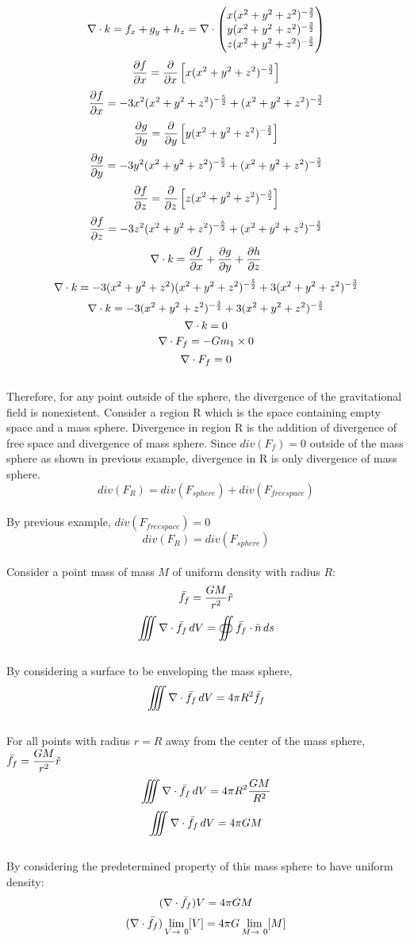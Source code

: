\documentclass[a4paper, 12pt]{report}
\begin{document}
\begin{center}
$$\nabla \cdot \displaystyle{k  =f_x + g_y + h_z =   \nabla\cdot\begin{pmatrix} x(x^2+y^2+z^2)^{-\frac{3}{2}}\\y(x^2+y^2+z^2)^{-\frac{3}{2}} \\z(x^2+y^2+z^2)^{-\frac{3}{2}} \end{pmatrix}}$$
$$\frac{\partial{f}}{\partial{x}}= \frac{\partial}{\partial{x}}\left[x(x^2+y^2+z^2)^{-\frac{3}{2}}\right]$$
$$\frac{\partial{f}}{\partial{x}}=-3x^2(x^2 +y ^2 + z^2)^{-\frac{5}{2}}+(x^2 + y^2 + z^2)^{-\frac{3}{2}}$$
$$\frac{\partial{g}}{\partial{y}}= \frac{\partial}{\partial{y}}\left[y(x^2+y^2+z^2)^{-\frac{3}{2}}\right]$$
$$\frac{\partial{g}}{\partial{y}}=-3y^2(x^2 +y ^2 + z^2)^{-\frac{5}{2}}+(x^2 + y^2 + z^2)^{-\frac{3}{2}}$$
$$\frac{\partial{f}}{\partial{z}}= \frac{\partial}{\partial{z}}\left[z(x^2+y^2+z^2)^{-\frac{3}{2}}\right]$$
$$\frac{\partial{f}}{\partial{z}}=-3z^2(x^2 +y ^2 + z^2)^{-\frac{5}{2}}+(x^2 + y^2 + z^2)^{-\frac{3}{2}}$$
$$\nabla \cdot k= \frac{\partial{f}}{\partial{x}} + \frac{\partial{g}}{\partial{y}} + \frac{\partial{h}}{\partial{z}}$$
$$\nabla \cdot k= -3(x^2 + y^2 + z^2)(x^2 +y ^2 + z^2)^{-\frac{5}{2}}+3(x^2 + y^2 + z^2)^{-\frac{3}{2}}$$
$$\nabla \cdot k= -3(x^2 +y ^2 + z^2)^{-\frac{3}{2}}+3(x^2 + y^2 + z^2)^{-\frac{3}{2}}$$
$$\nabla \cdot k= 0$$
$$\nabla \cdot F_f = -Gm_1 \times 0$$
$$\nabla \cdot F_f = 0$$
\\Therefore, for any point outside of the sphere, the divergence of the gravitational field is nonexistent.
Consider a region R which is the space containing empty space and a mass sphere. Divergence in region R is the addition of divergence of free space and divergence of mass sphere. Since $div(F_f) = 0$ outside of the mass sphere as shown in previous example, divergence in R is only divergence of mass sphere. 
$$div(F_{R}) = div(F_{sphere}) + div(F_{free space})$$
\\By previous example, $div(F_{free space}) = 0$
$$div(F_{R}) = div(F_{sphere})$$
\\Consider a point mass of mass $M$ of uniform density with radius $R$:
$$\bar{f_f} = \frac{GM}{r^2}\hat{r}$$
$$\displaystyle{\iiint \nabla\cdot\bar{f_f} \,dV =  \oiint {\bar{f_f} \cdot\bar{n}}\,ds }$$
\\By considering a surface to be enveloping the mass sphere,
$$\displaystyle{\iiint \nabla\cdot\bar{f_f} \,dV =  4 \pi R^2\bar{f_f} }$$
\\For all points with radius $r = R$ away from the center of the mass sphere, $\displaystyle{\bar{f_f} = \frac{GM}{r^2}\hat{r}}$
$$\iiint \nabla \cdot \bar{f_f} \,dV =  4 \pi R^2\frac{GM}{R^2}$$
$$\iiint \nabla \cdot \bar{f_f} \,dV =  4 \pi GM$$
\\By considering the predetermined property of this mass sphere to have uniform density:
$$(\nabla \cdot \bar{f_f}) V =  4 \pi GM$$
$$(\nabla \cdot \bar{f_f}) \lim_{V\to\ 0} [V] =  4 \pi G \lim_{M\to\ 0} [M]$$

\end{center}
\end{document}
